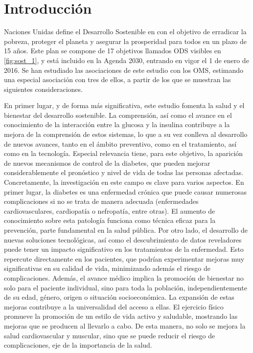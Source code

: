 
\section{Introducción}

Naciones Unidas define el Desarrollo Sostenible en \cite{ONU-ODS} con el objetivo de erradicar la pobreza, proteger el planeta y asegurar la prosperidad para todos en un plazo de 15 años. Este plan se compone de 17 objetivos llamados ODS visibles en \ref{fig:sost_1}, y está incluido en la Agenda 2030, entrando en vigor el 1 de enero de 2016. Se han estudiado las asociaciones de este estudio con los OMS, estimando una especial asociación con tres de ellos, a partir de los que se muestran las siguientes consideraciones.

En primer lugar, y de forma más significativa, este estudio fomenta la salud y el bienestar del desarrollo sostenible. La comprensión, así como el avance en el conocimiento de la interacción entre la glucosa y la insulina contribuye a la mejora de la comprensión de estos sistemas, lo que a su vez conlleva al desarrollo de nuevos avances, tanto en el ámbito preventivo, como en el tratamiento, así como en la tecnología. Especial relevancia tiene, para este objetivo, la aparición de nuevos mecanismos de control de la diabetes, que pueden mejorar considerablemente el pronóstico y nivel de vida de todas las personas afectadas. Concretamente, la investigación en este campo es clave para varios aspectos. En primer lugar, la diabetes es una enfermedad crónica que puede causar numerosas complicaciones si no se trata de manera adecuada (enfermedades cardiovasculares, cardiopatía o nefropatía, entre otras). El aumento de conocimiento sobre esta patología funciona como técnica eficaz para la prevención, parte fundamental en la salud pública. Por otro lado, el desarrollo de nuevas soluciones tecnológicas, así como el descubrimiento de datos reveladores puede tener un impacto significativo en los tratamientos de la enfermedad. Esto repercute directamente en los pacientes, que podrían experimentar mejoras muy significativas en su calidad de vida, minimizando además el riesgo de complicaciones. Además, el avance médico implica la promoción de bienestar no solo para el paciente individual, sino para toda la población, independientemente de su edad, género, origen o situación socioeconómica. La expansión de estas mejoras contribuye a la universalidad del acceso a ellas. El ejercicio físico promueve la promoción de un estilo de vida activo y saludable, mostrando las mejoras que se producen al llevarlo a cabo. De esta manera, no solo se mejora la salud cardiovascular y muscular, sino que se puede reducir el riesgo de complicaciones, eje de la importancia de la salud.

